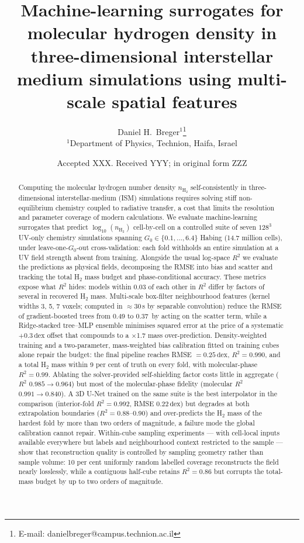 \documentclass[fleqn,usenatbib]{rasti}
\title[ML surrogates for \(\mathrm{H_2}\) density in ISM simulations]%
      {Machine-learning surrogates for molecular hydrogen density in
       three-dimensional interstellar medium simulations
       using multi-scale spatial features}
\author[D.~H.~Breger]{Daniel H.~Breger\(^{1}\)\thanks{E-mail: danielbreger@campus.technion.ac.il}
\\
\(^{1}\)Department of Physics, Technion,
Haifa, Israel}
\date{Accepted XXX. Received YYY; in original form ZZZ}
\newcommand{\nHH}{n_{\mathrm{H_2}}}
\newcommand{\logn}{\log_{10}(n_{\mathrm{H_2}})}
\newcommand{\Gzero}{G_0}
\newcommand{\dex}{\,\text{dex}}
\newcommand{\Rsq}{R^2}
\begin{document}
\label{firstpage}
\pagerange{\pageref{firstpage}--\pageref{lastpage}}
\maketitle

\begin{abstract}
Computing the molecular hydrogen number density \(\nHH\) self-consistently
in three-dimensional interstellar-medium (ISM) simulations requires
solving stiff non-equilibrium chemistry coupled to radiative transfer, a
cost that limits the resolution and parameter coverage of modern
calculations. We evaluate machine-learning surrogates that predict
\(\logn\) cell-by-cell on a controlled suite of seven \(128^3\) UV-only
chemistry simulations spanning \(\Gzero \in \{0.1, \dots, 6.4\}\) Habing
(14.7 million cells), under leave-one-\(\Gzero\)-out cross-validation:
each fold withholds an entire simulation at a UV field strength absent
from training. Alongside the usual log-space \(\Rsq\) we evaluate the
predictions as physical fields, decomposing the RMSE into bias and
scatter and tracking the total H\(_2\) mass budget and phase-conditional
accuracy. These metrics expose what \(\Rsq\) hides: models within 0.03 of
each other in \(\Rsq\) differ by factors of several in recovered H\(_2\)
mass. Multi-scale box-filter neighbourhood features (kernel widths 3, 5,
7 voxels; computed in \(\approx\)30\,s by separable convolution) reduce
the RMSE of gradient-boosted trees from 0.49 to 0.37\dex{} by acting on
the scatter term, while a Ridge-stacked tree--MLP ensemble minimises
squared error at the price of a systematic \(+0.3\dex\) offset that
compounds to a \(\times\)1.7 mass over-prediction. Density-weighted
training and a two-parameter, mass-weighted bias calibration fitted on
training cubes alone repair the budget: the final pipeline reaches
RMSE \(= 0.25\dex\), \(\Rsq = 0.990\), and a total H\(_2\) mass within 9 per
cent of truth on every fold, with molecular-phase \(\Rsq = 0.99\).
Ablating the solver-provided self-shielding factor costs little in
aggregate (\(\Rsq\) \(0.985 \rightarrow 0.964\)) but most of the
molecular-phase fidelity (molecular \(\Rsq\) \(0.991 \rightarrow 0.840\)).
A 3D U-Net trained on the same suite is the best interpolator in the
comparison (interior-fold \(\Rsq = 0.992\), RMSE \(0.22\dex\)) but degrades
at both extrapolation boundaries (\(\Rsq = 0.88\)--0.90) and over-predicts
the H\(_2\) mass of the hardest fold by more than two orders of magnitude,
a failure mode the global calibration cannot repair. Within-cube sampling experiments --- with cell-local inputs available
everywhere but labels and neighbourhood context restricted to the
sample --- show that reconstruction quality is controlled by sampling
geometry rather than sample volume: 10 per cent uniformly random
labelled coverage reconstructs the field nearly losslessly, while a
contiguous half-cube retains \(\Rsq = 0.86\) but corrupts the total-mass
budget by up to two orders of magnitude.
\end{abstract}
\end{document}
